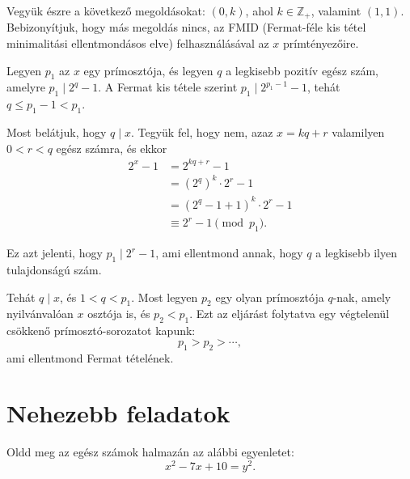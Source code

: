 \begin{solution}
	Vegyük észre a következő megoldásokat: $(0,k)$, ahol $k\in\mathbb{Z}_{+}$,
	valamint $(1,1)$. Bebizonyítjuk, hogy más megoldás nincs, az FMID
	(Fermat-féle kis tétel minimalitási ellentmondásos elve) felhasználásával
	az $x$ prímtényezőire.
	
	Legyen $p_{1}$ az $x$ egy prímosztója, és legyen $q$ a legkisebb
	pozitív egész szám, amelyre $p_{1}\mid2^{q}-1$. A Fermat kis tétele
	szerint $p_{1}\mid2^{p_{1}-1}-1$, tehát $q\leq p_{1}-1<p_{1}$.
	
	Most belátjuk, hogy $q\mid x$. Tegyük fel, hogy nem, azaz $x=kq+r$
	valamilyen $0<r<q$ egész számra, és ekkor 
	\begin{align*}
		2^{x}-1 & =2^{kq+r}-1\\
		& =(2^{q})^{k}\cdot2^{r}-1\\
		& =(2^{q}-1+1)^{k}\cdot2^{r}-1\\
		& \equiv2^{r}-1\pmod{p_{1}}.
	\end{align*}
	
	Ez azt jelenti, hogy $p_{1}\mid2^{r}-1$, ami ellentmond annak, hogy
	$q$ a legkisebb ilyen tulajdonságú szám.
	
	Tehát $q\mid x$, és $1<q<p_{1}$. Most legyen $p_{2}$ egy olyan
	prímosztója $q$-nak, amely nyilvánvalóan $x$ osztója is, és $p_{2}<p_{1}$.
	Ezt az eljárást folytatva egy végtelenül csökkenő prímosztó-sorozatot
	kapunk: 
	\[
	p_{1}>p_{2}>\cdots,
	\]
	ami ellentmond Fermat tételének. 
\end{solution}

\section*{Nehezebb feladatok}

\begin{extraproblem}
	Oldd meg az egész számok halmazán az alábbi egyenletet:
	$$x^{2} - 7x + 10 = y^{2}.$$
\end{extraproblem}


